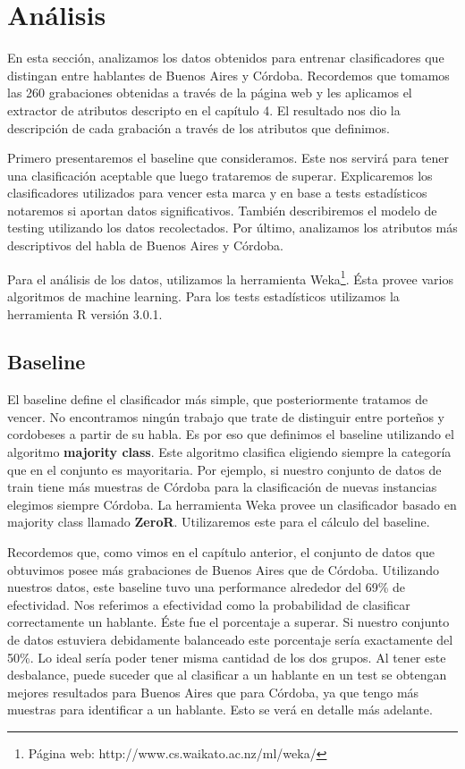 
\chapter{Análisis}

En esta sección, analizamos los datos obtenidos para entrenar clasificadores que distingan entre hablantes de Buenos Aires y Córdoba. Recordemos que tomamos las 260 grabaciones obtenidas a través de la página web y les aplicamos el extractor de atributos descripto en el capítulo 4. El resultado nos dio la descripción de cada grabación a través de los atributos que definimos. 

Primero presentaremos el baseline que consideramos. Este nos servirá para tener una clasificación aceptable que luego trataremos de superar. Explicaremos los clasificadores utilizados para vencer esta marca y en base a tests estadísticos notaremos si aportan datos significativos. También describiremos el modelo de testing utilizando los datos recolectados. Por último, analizamos los atributos más descriptivos del habla de Buenos Aires y Córdoba. 

Para el análisis de los datos, utilizamos la herramienta Weka\footnote{Página web: http://www.cs.waikato.ac.nz/ml/weka/}. Ésta provee varios algoritmos de machine learning. Para los tests estadísticos utilizamos la herramienta R versión 3.0.1. 

\section{Baseline}

El baseline define el clasificador más simple, que posteriormente tratamos de vencer. No encontramos ningún trabajo que trate de distinguir entre porteños y cordobeses a partir de su habla. Es por eso que definimos el baseline utilizando el algoritmo \textbf{majority class}. Este algoritmo clasifica eligiendo siempre la categoría que en el conjunto es mayoritaria. Por ejemplo, si nuestro conjunto de datos de train tiene más muestras de Córdoba para la clasificación de nuevas instancias elegimos siempre Córdoba. La herramienta Weka provee un clasificador basado en majority class llamado \textbf{ZeroR}. Utilizaremos este para el cálculo del baseline. 

Recordemos que, como vimos en el capítulo anterior, el conjunto de datos que obtuvimos posee más grabaciones de Buenos Aires que de Córdoba. Utilizando nuestros datos, este baseline tuvo una performance alrededor del 69\% de efectividad. Nos referimos a efectividad como la probabilidad de clasificar correctamente un hablante. Éste fue el porcentaje a superar. Si nuestro conjunto de datos estuviera debidamente balanceado este porcentaje sería exactamente del 50\%. Lo ideal sería poder tener misma cantidad de los dos grupos. Al tener este desbalance, puede suceder que al clasificar a un hablante en un test se obtengan mejores resultados para Buenos Aires que para Córdoba, ya que tengo más muestras para identificar a un hablante. Esto se verá en detalle más adelante.

